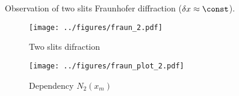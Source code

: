 Observation of two slits Fraunhofer diffraction ($\delta x \approx \const$).
\begin{figure}[h]
    \begin{minipage}{0.48\textwidth}
            \hspace{-0.5cm}
            \texttt{[image: ../figures/fraun\_2.pdf]}
            \vspace{-9mm}
            \caption{Two slits difraction}
    \end{minipage}
    \hfill
    \begin{minipage}{0.48\textwidth}
            \texttt{[image: ../figures/fraun\_plot\_2.pdf]}
            \vspace{1mm}
            \caption{Dependency $N_2(x_m)$}
    \end{minipage}
\end{figure}

